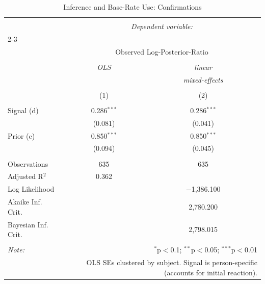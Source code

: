 
\begin{table}[!htbp] \centering 
  \caption{Inference and Base-Rate Use: Confirmations} 
  \label{} 
\begin{tabular}{@{\extracolsep{5pt}}lcc} 
\\[-1.8ex]\hline 
\hline \\[-1.8ex] 
 & \multicolumn{2}{c}{\textit{Dependent variable:}} \\ 
\cline{2-3} 
\\[-1.8ex] & \multicolumn{2}{c}{Observed Log-Posterior-Ratio} \\ 
\\[-1.8ex] & \textit{OLS} & \textit{linear} \\ 
 & \textit{} & \textit{mixed-effects} \\ 
\\[-1.8ex] & (1) & (2)\\ 
\hline \\[-1.8ex] 
 Signal (d) & 0.286$^{***}$ & 0.286$^{***}$ \\ 
  & (0.081) & (0.041) \\ 
  Prior (c) & 0.850$^{***}$ & 0.850$^{***}$ \\ 
  & (0.094) & (0.045) \\ 
 \hline \\[-1.8ex] 
Observations & 635 & 635 \\ 
Adjusted R$^{2}$ & 0.362 &  \\ 
Log Likelihood &  & $-$1,386.100 \\ 
Akaike Inf. Crit. &  & 2,780.200 \\ 
Bayesian Inf. Crit. &  & 2,798.015 \\ 
\hline 
\hline \\[-1.8ex] 
\textit{Note:}  & \multicolumn{2}{r}{$^{*}$p$<$0.1; $^{**}$p$<$0.05; $^{***}$p$<$0.01} \\ 
 & \multicolumn{2}{r}{OLS SEs clustered by subject. Signal is person-specific (accounts for initial reaction).} \\ 
\end{tabular} 
\end{table} 
